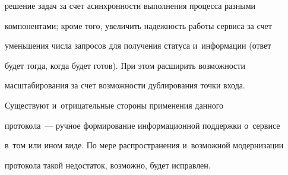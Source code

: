 решение задач за счет асинхронности выполнения процесса разными 


компонентами; кроме того, увеличить надежность работы сервиса за счет 


уменьшения числа запросов для получения статуса и~информации (ответ 


будет тогда, когда будет готов). При этом расширить возможности 


масштабирования за счет возможности дублирования точки входа.





    Существуют и~отрицательные стороны применения данного 


протокола~--- ручное формирование информационной поддержки о~сервисе 


в~том или ином виде. По мере распространения и~возможной модернизации 


протокола такой недостаток, возможно, будет исправлен. 





\vspace*{-4pt}






